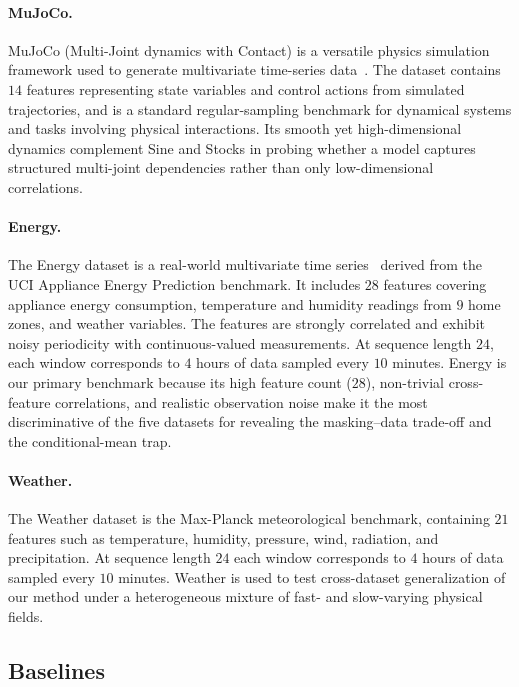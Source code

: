 \documentclass{article}
\theoremstyle{plain}
\theoremstyle{definition}
\theoremstyle{remark}
\begin{document}
\paragraph{MuJoCo.}
MuJoCo (Multi-Joint dynamics with Contact) is a versatile physics simulation framework used to generate multivariate time-series data~\citep{todorov2012mujoco}. The dataset contains $14$ features representing state variables and control actions from simulated trajectories, and is a standard regular-sampling benchmark for dynamical systems and tasks involving physical interactions. Its smooth yet high-dimensional dynamics complement Sine and Stocks in probing whether a model captures structured multi-joint dependencies rather than only low-dimensional correlations.

\paragraph{Energy.}
The Energy dataset is a real-world multivariate time series~\citep{candanedo2017data} derived from the UCI Appliance Energy Prediction benchmark. It includes $28$ features covering appliance energy consumption, temperature and humidity readings from $9$ home zones, and weather variables. The features are strongly correlated and exhibit noisy periodicity with continuous-valued measurements. At sequence length $24$, each window corresponds to $4$ hours of data sampled every $10$ minutes. Energy is our primary benchmark because its high feature count ($28$), non-trivial cross-feature correlations, and realistic observation noise make it the most discriminative of the five datasets for revealing the masking--data trade-off and the conditional-mean trap.

\paragraph{Weather.}
The Weather dataset is the Max-Planck meteorological benchmark, containing $21$ features such as temperature, humidity, pressure, wind, radiation, and precipitation. At sequence length $24$ each window corresponds to $4$ hours of data sampled every $10$ minutes. Weather is used to test cross-dataset generalization of our method under a heterogeneous mixture of fast- and slow-varying physical fields.

\subsection{Baselines}
\end{document}
